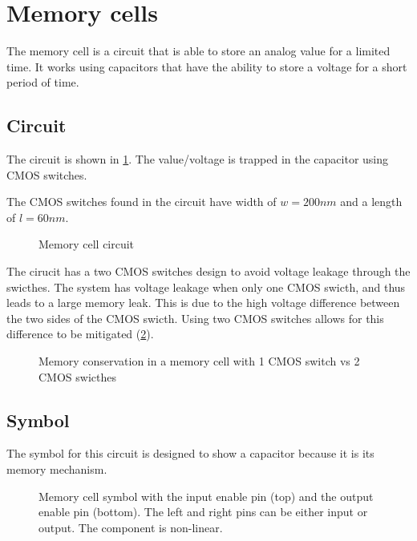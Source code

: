 \section{Memory cells}
\label{sec:memcell}

The memory cell is a circuit that is able to store an analog value for a limited time. It works using capacitors that have the ability to store a voltage for a short period of time.

\subsection{Circuit}

The circuit is shown in \cref{circt:memcell}. The value/voltage is trapped in the capacitor using \ac{CMOS} switches.

The \ac{CMOS} switches found in the circuit have width of $w=200nm$ and a length of $l=60nm$.

\begin{figure}[H]
  \centering
  
  \caption{Memory cell circuit}
  \label{circt:memcell}
\end{figure}

The cirucit has a two \ac{CMOS} switches design to avoid voltage leakage through the swicthes. The system has voltage leakage when only one \ac{CMOS} swicth, and thus leads to a large memory leak. This is due to the high voltage difference between the two sides of the \ac{CMOS} swicth. Using two \ac{CMOS} switches allows for this difference to be mitigated (\cref{fig:memcellLoss}).

\begin{figure}[H]
  \centering
  
  \caption{Memory conservation in a memory cell with 1 \ac{CMOS} switch vs 2 \ac{CMOS} swicthes}
  \label{fig:memcellLoss}
\end{figure}

\subsection{Symbol}

The symbol for this circuit is designed to show a capacitor because it is its memory mechanism.

\begin{figure}[H]
  \centering
  
  \caption{Memory cell symbol with the input enable pin (top) and the output enable pin (bottom). The left and right pins can be either input or output. The component is non-linear.}
  \label{sym:memcell}
\end{figure}

